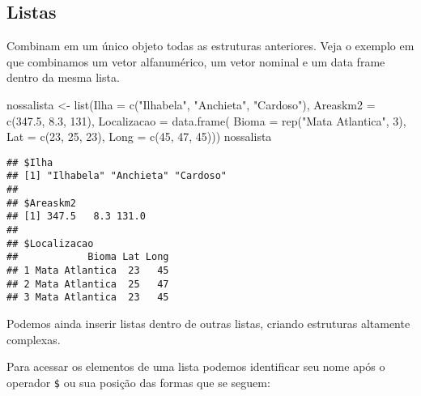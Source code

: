 \documentclass[
]{book}
\newenvironment{Shaded}{\begin{snugshade}}{\end{snugshade}}
\newcommand{\AttributeTok}[1]{\textcolor[rgb]{0.77,0.63,0.00}{#1}}
\newcommand{\DecValTok}[1]{\textcolor[rgb]{0.00,0.00,0.81}{#1}}
\newcommand{\FloatTok}[1]{\textcolor[rgb]{0.00,0.00,0.81}{#1}}
\newcommand{\FunctionTok}[1]{\textcolor[rgb]{0.00,0.00,0.00}{#1}}
\newcommand{\NormalTok}[1]{#1}
\newcommand{\OtherTok}[1]{\textcolor[rgb]{0.56,0.35,0.01}{#1}}
\newcommand{\SpecialCharTok}[1]{\textcolor[rgb]{0.00,0.00,0.00}{#1}}
\newcommand{\StringTok}[1]{\textcolor[rgb]{0.31,0.60,0.02}{#1}}
\begin{document}
\hypertarget{listas}{%
\subsection{Listas}\label{listas}}

Combinam em um único objeto todas as estruturas anteriores. Veja o exemplo em que combinamos um vetor alfanumérico, um vetor nominal e um data frame dentro da mesma lista.

\begin{Shaded}
\begin{Highlighting}[]
\NormalTok{nossalista }\OtherTok{\textless{}{-}} \FunctionTok{list}\NormalTok{(}\AttributeTok{Ilha =} \FunctionTok{c}\NormalTok{(}\StringTok{"Ilhabela"}\NormalTok{, }\StringTok{"Anchieta"}\NormalTok{, }\StringTok{"Cardoso"}\NormalTok{), }
                  \AttributeTok{Areaskm2 =} \FunctionTok{c}\NormalTok{(}\FloatTok{347.5}\NormalTok{, }\FloatTok{8.3}\NormalTok{, }\DecValTok{131}\NormalTok{), }
                  \AttributeTok{Localizacao =} \FunctionTok{data.frame}\NormalTok{(}
                    \AttributeTok{Bioma =} \FunctionTok{rep}\NormalTok{(}\StringTok{"Mata Atlantica"}\NormalTok{, }\DecValTok{3}\NormalTok{),}
                  \AttributeTok{Lat =} \FunctionTok{c}\NormalTok{(}\DecValTok{23}\NormalTok{, }\DecValTok{25}\NormalTok{, }\DecValTok{23}\NormalTok{),}
                  \AttributeTok{Long =} \FunctionTok{c}\NormalTok{(}\DecValTok{45}\NormalTok{, }\DecValTok{47}\NormalTok{, }\DecValTok{45}\NormalTok{)))}
\NormalTok{nossalista}
\end{Highlighting}
\end{Shaded}

\begin{verbatim}
## $Ilha
## [1] "Ilhabela" "Anchieta" "Cardoso" 
## 
## $Areaskm2
## [1] 347.5   8.3 131.0
## 
## $Localizacao
##            Bioma Lat Long
## 1 Mata Atlantica  23   45
## 2 Mata Atlantica  25   47
## 3 Mata Atlantica  23   45
\end{verbatim}

Podemos ainda inserir listas dentro de outras listas, criando estruturas altamente complexas.

Para acessar os elementos de uma lista podemos identificar seu nome após o operador \texttt{\$} ou sua posição das formas que se seguem:

\begin{Shaded}
\end{Shaded}
\end{document}
